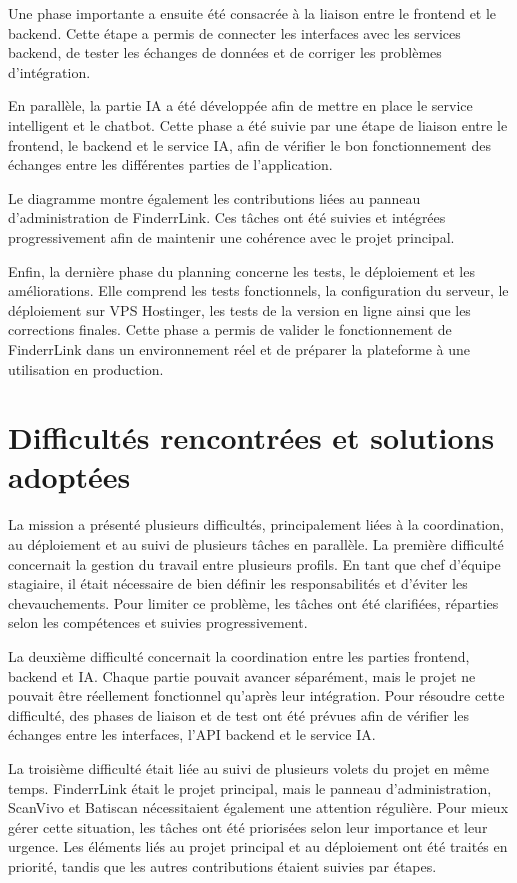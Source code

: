Une phase importante a ensuite été consacrée à la liaison entre le frontend et le backend. Cette étape a permis de connecter les interfaces avec les services backend, de tester les échanges de données et de corriger les problèmes d'intégration.

En parallèle, la partie IA a été développée afin de mettre en place le service intelligent et le chatbot. Cette phase a été suivie par une étape de liaison entre le frontend, le backend et le service IA, afin de vérifier le bon fonctionnement des échanges entre les différentes parties de l'application.

Le diagramme montre également les contributions liées au panneau d'administration de FinderrLink. Ces tâches ont été suivies et intégrées progressivement afin de maintenir une cohérence avec le projet principal.

Enfin, la dernière phase du planning concerne les tests, le déploiement et les améliorations. Elle comprend les tests fonctionnels, la configuration du serveur, le déploiement sur VPS Hostinger, les tests de la version en ligne ainsi que les corrections finales. Cette phase a permis de valider le fonctionnement de FinderrLink dans un environnement réel et de préparer la plateforme à une utilisation en production.

\section{Difficultés rencontrées et solutions adoptées}

La mission a présenté plusieurs difficultés, principalement liées à la coordination, au déploiement et au suivi de plusieurs tâches en parallèle. La première difficulté concernait la gestion du travail entre plusieurs profils. En tant que chef d'équipe stagiaire, il était nécessaire de bien définir les responsabilités et d'éviter les chevauchements. Pour limiter ce problème, les tâches ont été clarifiées, réparties selon les compétences et suivies progressivement.

La deuxième difficulté concernait la coordination entre les parties frontend, backend et IA. Chaque partie pouvait avancer séparément, mais le projet ne pouvait être réellement fonctionnel qu'après leur intégration. Pour résoudre cette difficulté, des phases de liaison et de test ont été prévues afin de vérifier les échanges entre les interfaces, l'API backend et le service IA.

La troisième difficulté était liée au suivi de plusieurs volets du projet en même temps. FinderrLink était le projet principal, mais le panneau d'administration, ScanVivo et Batiscan nécessitaient également une attention régulière. Pour mieux gérer cette situation, les tâches ont été priorisées selon leur importance et leur urgence. Les éléments liés au projet principal et au déploiement ont été traités en priorité, tandis que les autres contributions étaient suivies par étapes.

